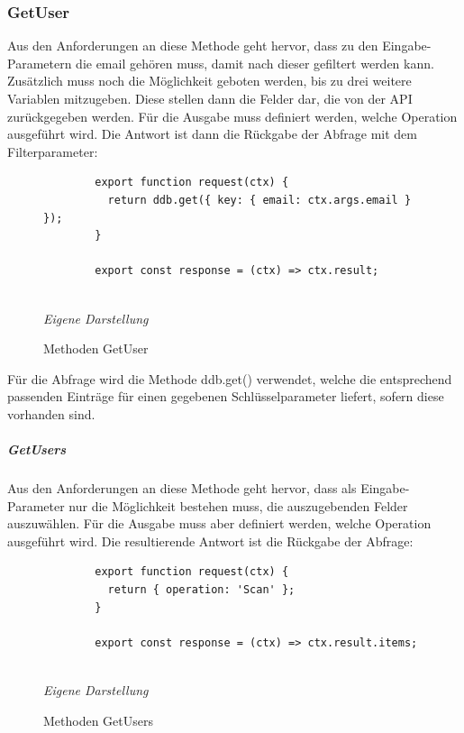 		\subsubsection{GetUser}
		
	Aus den Anforderungen an diese Methode geht hervor, dass zu den Eingabe-Parametern die email gehören muss, damit nach dieser gefiltert werden kann. Zusätzlich muss noch die Möglichkeit geboten werden, bis zu drei weitere Variablen mitzugeben. Diese stellen dann die Felder dar, die von der API zurückgegeben werden. Für die Ausgabe muss definiert werden, welche Operation ausgeführt wird. Die Antwort ist dann die Rückgabe der Abfrage mit dem Filterparameter:\newline
	
		\begin{figure}[H]
		\centering
		\begin{minipage}[t]{.7\textwidth} %
		\caption{Methoden GetUser} %
		\begin{verbatim}
		export function request(ctx) {
		  return ddb.get({ key: { email: ctx.args.email } });
		}
		
		export const response = (ctx) => ctx.result;
		
		\end{verbatim}
		
		\textit{Eigene Darstellung} %
		\label{fig:getUserMethoden}
		\end{minipage}
		\end{figure}
	Für die Abfrage wird die Methode ddb.get() verwendet, welche die entsprechend passenden Einträge für einen gegebenen Schlüsselparameter liefert, sofern diese vorhanden sind.
	\subparagraph{GetUsers}
	Aus den Anforderungen an diese Methode geht hervor, dass als Eingabe-Parameter nur die Möglichkeit bestehen muss, die auszugebenden Felder auszuwählen. Für die Ausgabe muss aber definiert werden, welche Operation ausgeführt wird. Die resultierende Antwort ist die Rückgabe der Abfrage:\newline
		\begin{figure}[H]
		\centering
		\begin{minipage}[t]{.7\textwidth} %
		\caption{Methoden GetUsers} %
		\begin{verbatim}
		export function request(ctx) {
		  return { operation: 'Scan' };
		}
		
		export const response = (ctx) => ctx.result.items;
		
		\end{verbatim}
		
		\textit{Eigene Darstellung} %
		\label{fig:getUsersMethoden}
		\end{minipage}
		\end{figure}
